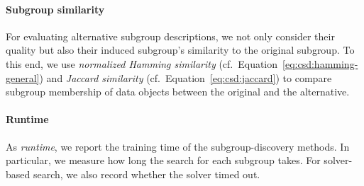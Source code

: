 \documentclass{article}
\theoremstyle{definition}
\begin{document}
\paragraph{Subgroup similarity}

For evaluating alternative subgroup descriptions, we not only consider their quality but also their induced subgroup's similarity to the original subgroup.
To this end, we use \emph{normalized Hamming similarity} (cf.~Equation~\ref{eq:csd:hamming-general}) and \emph{Jaccard similarity} (cf.~Equation~\ref{eq:csd:jaccard}) to compare subgroup membership of data objects between the original and the alternative.

\paragraph{Runtime}

As \emph{runtime}, we report the training time of the subgroup-discovery methods.
In particular, we measure how long the search for each subgroup takes.
For solver-based search, we also record whether the solver timed out.
\end{document}
